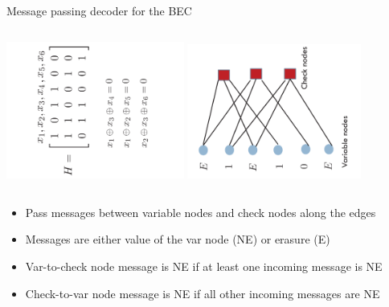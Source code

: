 \documentclass[10pt,xcolor=table]{beamer}
\begin{document}
\begin{frame}{Message passing decoder for the BEC}
\begin{columns}
\includegraphics[width=2.3in,angle=-90]{./Figures/paritycheckmatrix63code}
\includegraphics[width=2.25in,angle=-90]{./Figures/Tannergraph63codewitherasures}
\end{columns}
\vspace{-5mm}
\begin{block}{}
\begin{itemize}
  \item Pass messages between variable nodes and check nodes along the edges
  \item Messages are either value of the var node (NE) or erasure (E)
  \item Var-to-check node message is NE if \alert{at least one incoming message is NE}
  \item Check-to-var node message is NE if \alert{all other incoming messages are NE}
\end{itemize}
\end{block}
\end{frame}
\end{document}
